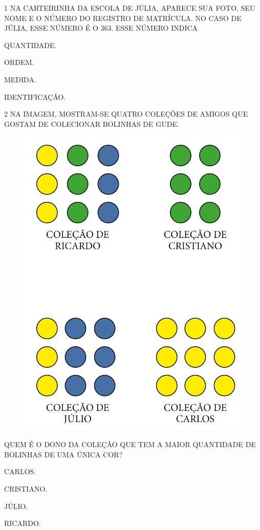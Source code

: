 \num{1} NA CARTEIRINHA DA ESCOLA DE JÚLIA, APARECE SUA FOTO, SEU NOME E O NÚMERO DO
REGISTRO DE MATRÍCULA. NO CASO DE JÚLIA, ESSE NÚMERO É O 363. ESSE NÚMERO INDICA

\begin{escolha}
\item
  QUANTIDADE.
\item
  ORDEM.
\item
  MEDIDA.
\item
  IDENTIFICAÇÃO.
\end{escolha}

\num{2} NA IMAGEM, MOSTRAM-SE QUATRO COLEÇÕES DE AMIGOS QUE GOSTAM DE COLECIONAR
BOLINHAS DE GUDE.

\begin{figure}[H]
\centering
\includegraphics[width=.7\textwidth]{./media/SAEB_1ANO_MAT_FIGURA16.png}
\end{figure}

\noindent{}QUEM É O DONO DA COLEÇÃO QUE TEM A MAIOR QUANTIDADE DE BOLINHAS DE UMA ÚNICA COR?

\begin{escolha}
\item
  CARLOS.
\item
  CRISTIANO.
\item
  JÚLIO.
\item
  RICARDO.
\end{escolha}

